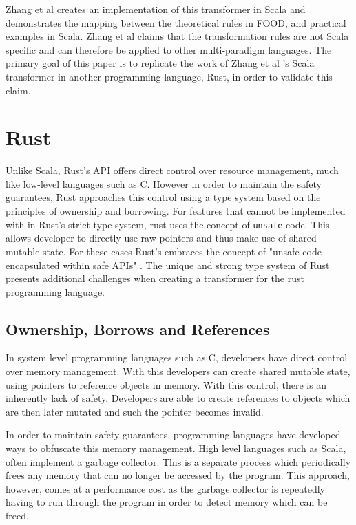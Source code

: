 \documentclass[ oneside,%
                    author={James Elgar},
                    degree={MEng},
                     title={Bidirectional transformer between functional and \\ object-oriented programming in Rust},
                  subtitle={}]{dissertation}
\newcommand{\weixin}{Zhang et al }
\newcommand{\rust}[1]{\texttt{#1}}
\begin{document}
\weixin creates an implementation of this transformer in Scala and demonstrates the mapping between the theoretical rules in FOOD, and practical examples in Scala.
\weixin claims that the transformation rules are not Scala specific and can therefore be applied to other multi-paradigm languages. The primary goal of this paper is to replicate the work of \weixin's Scala transformer in another programming language, Rust, in order to validate this claim.



\section{Rust}

Unlike Scala, Rust's API offers direct control over resource management, much like low-level languages such as C. However in order to maintain the safety guarantees, Rust approaches this control using a type system based on the principles of ownership and borrowing. For features that cannot be implemented with in Rust's strict type system, rust uses the concept of \rust{unsafe} code. This allows developer to directly use raw pointers and thus make use of shared mutable state. For these cases Rust's embraces the concept of "unsafe code encapsulated within safe APIs" \cite{rustsafesystems}.
The unique and strong type system of Rust presents additional challenges when creating a transformer for the rust programming language.

\subsection{Ownership, Borrows and References}

In system level programming languages such as C, developers have direct control over memory management. With this developers can create shared mutable state, using pointers to reference objects in memory. With this control, there is an inherently lack of safety. Developers are able to create references to objects which are then later mutated and such the pointer becomes invalid.

In order to maintain safety guarantees, programming languages have developed ways to obfuscate this memory management. High level languages such as Scala, often implement a garbage collector. This is a separate process which periodically frees any memory that can no longer be accessed by the program. This approach, however, comes at a performance cost as the garbage collector is repeatedly having to run through the program in order to detect memory which can be freed.
\end{document}
